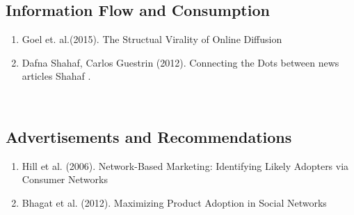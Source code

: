 \subsection{Information Flow and Consumption}  
\begin{enumerate}  

\item  Goel et.  al.(2015).  The Structual Virality of Online Diffusion\cite{Goel_2015}  
\item  Dafna Shahaf, Carlos Guestrin (2012). Connecting the Dots between news articles Shahaf  . \cite{Shahaf:2012:CTD:2086737.2086744} \end{enumerate}  
\\  
\subsection{Advertisements and Recommendations}  
\begin{enumerate}  
\item Hill et al. (2006).  Network-Based Marketing: Identifying Likely Adopters via Consumer Networks\cite{Hill_2006}  
  
\item Bhagat et al. (2012). Maximizing Product Adoption in Social Networks\cite{Bhagat:2012:MPA:2124295.2124368} 
\end{enumerate} 